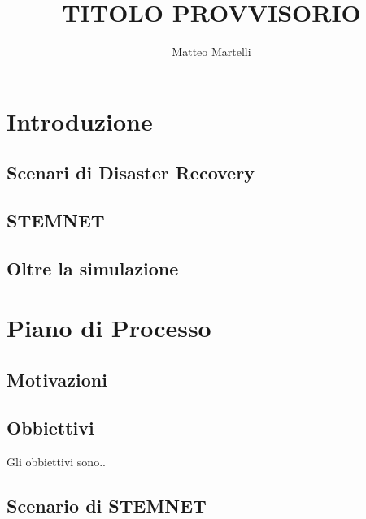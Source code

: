 \documentclass[a4paper,11pt]{report}
\title{TITOLO PROVVISORIO}
\author{Matteo Martelli}
\begin{document}
\maketitle
\tableofcontents

\begin{abstract}
\end{abstract}

\chapter{Introduzione}

\section{Scenari di Disaster Recovery}

\section{STEMNET}

\section{Oltre la simulazione}

\chapter{Piano di Processo}

\section{Motivazioni}

\section{Obbiettivi}
Gli obbiettivi sono..

\section{Scenario di STEMNET}
\end{document}
